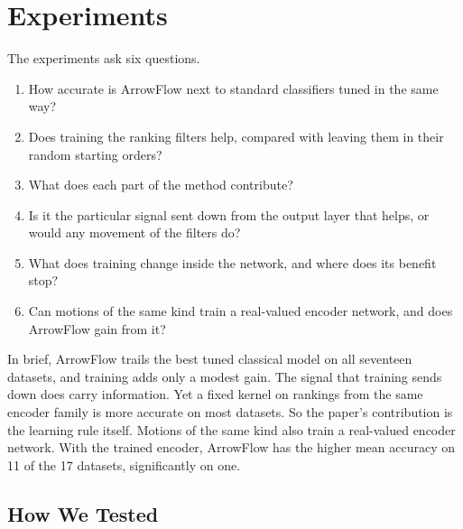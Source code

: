 \section{Experiments}\label{sec:experiments}

The experiments ask six questions.
\begin{enumerate}[leftmargin=2em,topsep=2pt,itemsep=1pt]
\item How accurate is ArrowFlow next to standard classifiers tuned in the same way?
\item Does training the ranking filters help, compared with leaving them in their random starting orders?
\item What does each part of the method contribute?
\item Is it the particular signal sent down from the output layer that helps, or would any movement of the filters do?
\item What does training change inside the network, and where does its benefit stop?
\item Can motions of the same kind train a real-valued encoder network, and does ArrowFlow gain from it?
\end{enumerate}

In brief, ArrowFlow trails the best tuned classical model on all seventeen datasets, and training adds only a modest gain. The signal that training sends down does carry information. Yet a fixed kernel on rankings from the same encoder family is more accurate on most datasets. So the paper's contribution is the learning rule itself. Motions of the same kind also train a real-valued encoder network. With the trained encoder, ArrowFlow has the higher mean accuracy on 11 of the 17 datasets, significantly on one.

\subsection{How We Tested}\label{sec:protocol}

